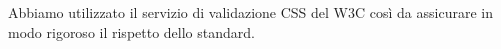 Abbiamo utilizzato il servizio di validazione CSS del W3C così da assicurare in modo rigoroso il rispetto dello standard.